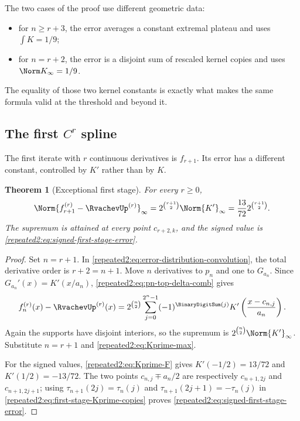\documentclass[11pt,oneside]{article}
\newtheorem{theorem}{Theorem}[section]
\theoremstyle{definition}
\theoremstyle{remark}
\begin{document}
The two cases of the proof use different geometric data:
\begin{itemize}
\item for $n\ge r+3$, the error averages a constant extremal plateau and uses
$\int K=1/9$;
\item for $n=r+2$, the error is a disjoint sum of rescaled kernel copies and uses
$\Norm K_\infty=1/9$.
\end{itemize}
The equality of those two kernel constants is exactly what makes the same formula valid at
the threshold and beyond it.

\subsection{The first \texorpdfstring{$C^r$}{C-r} spline}

The first iterate with $r$ continuous derivatives is $f_{r+1}$.  Its error has a different
constant, controlled by $K'$ rather than by $K$.

\begin{theorem}[Exceptional first stage]
\label{repeated2:thm:first-admissible-stage}
For every $r\ge0$,
\begin{equation}
 \Norm{f_{r+1}^{(r)}-\RvachevUp^{(r)}}_\infty
 =2^{\binom{r+1}{2}}\Norm{K'}_\infty
 =\frac{13}{72}2^{\binom{r+1}{2}}.
 \label{repeated2:eq:first-stage-full}
\end{equation}
The supremum is attained at every point $c_{r+2,k}$, and the signed value is
\eqref{repeated2:eq:signed-first-stage-error}.
\end{theorem}

\begin{proof}
Set $n=r+1$.  In \eqref{repeated2:eq:error-distribution-convolution}, the total derivative order is
$r+2=n+1$.  Move $n$ derivatives to $p_n$ and one to $G_{a_n}$.  Since
$G_{a_n}'(x)=K'(x/a_n)$, \eqref{repeated2:eq:pn-top-delta-comb} gives
\begin{equation}
 f_n^{(r)}(x)-\RvachevUp^{(r)}(x)
 =2^{\binom n2}\sum_{j=0}^{2^n-1}(-1)^{\BinaryDigitSum(j)}
 K'\left(\frac{x-c_{n,j}}{a_n}\right).
 \label{repeated2:eq:first-stage-Kprime-copies}
\end{equation}
Again the supports have disjoint interiors, so the supremum is
$2^{\binom n2}\Norm{K'}_\infty$.  Substitute $n=r+1$ and
\eqref{repeated2:eq:Kprime-max}.

For the signed values, \eqref{repeated2:eq:Kprime-F} gives
$K'(-1/2)=13/72$ and $K'(1/2)=-13/72$.  The two points
$c_{n,j}\mp a_n/2$ are respectively $c_{n+1,2j}$ and $c_{n+1,2j+1}$; using
$\tau_{n+1}(2j)=\tau_n(j)$ and
$\tau_{n+1}(2j+1)=-\tau_n(j)$ in
\eqref{repeated2:eq:first-stage-Kprime-copies} proves
\eqref{repeated2:eq:signed-first-stage-error}.
\end{proof}
\end{document}
